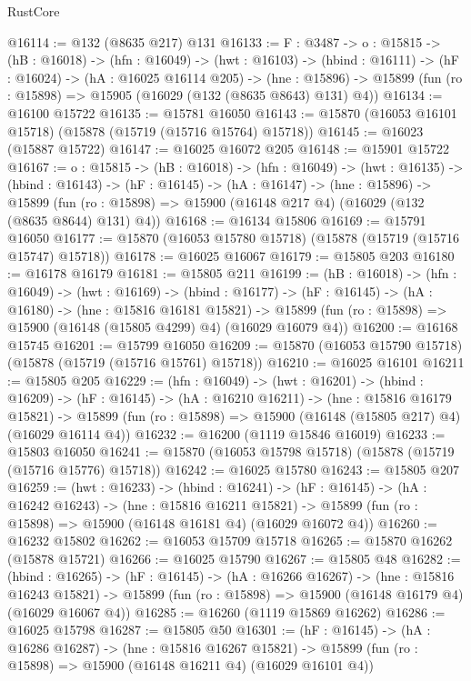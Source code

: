 \begin{lexlean}{RustCore}
\begin{coremodule}
@16114 := @132 (@8635 @217) @131
@16133 := {F : @3487} ->
  {o : @15815} ->
  (hB : @16018) ->
  (hfn : @16049) ->
  (hwt : @16103) ->
  (hbind : @16111) ->
  (hF : @16024) ->
  (hA : @16025 @16114 @205) ->
  (hne : @15896) -> @15899 (fun (ro : @15898) => @15905 (@16029 (@132 (@8635 @8643) @131) @4))
@16134 := @16100 @15722
@16135 := @15781 @16050
@16143 := @15870 (@16053 @16101 @15718) (@15878 (@15719 (@15716 @15764) @15718))
@16145 := @16023 (@15887 @15722)
@16147 := @16025 @16072 @205
@16148 := @15901 @15722
@16167 := {o : @15815} ->
  (hB : @16018) ->
  (hfn : @16049) ->
  (hwt : @16135) ->
  (hbind : @16143) ->
  (hF : @16145) ->
  (hA : @16147) ->
  (hne : @15896) ->
  @15899 (fun (ro : @15898) => @15900 (@16148 @217 @4) (@16029 (@132 (@8635 @8644) @131) @4))
@16168 := @16134 @15806
@16169 := @15791 @16050
@16177 := @15870 (@16053 @15780 @15718) (@15878 (@15719 (@15716 @15747) @15718))
@16178 := @16025 @16067
@16179 := @15805 @203
@16180 := @16178 @16179
@16181 := @15805 @211
@16199 := (hB : @16018) ->
  (hfn : @16049) ->
  (hwt : @16169) ->
  (hbind : @16177) ->
  (hF : @16145) ->
  (hA : @16180) ->
  (hne : @15816 @16181 @15821) ->
  @15899 (fun (ro : @15898) => @15900 (@16148 (@15805 @4299) @4) (@16029 @16079 @4))
@16200 := @16168 @15745
@16201 := @15799 @16050
@16209 := @15870 (@16053 @15790 @15718) (@15878 (@15719 (@15716 @15761) @15718))
@16210 := @16025 @16101
@16211 := @15805 @205
@16229 := (hfn : @16049) ->
  (hwt : @16201) ->
  (hbind : @16209) ->
  (hF : @16145) ->
  (hA : @16210 @16211) ->
  (hne : @15816 @16179 @15821) ->
  @15899 (fun (ro : @15898) => @15900 (@16148 (@15805 @217) @4) (@16029 @16114 @4))
@16232 := @16200 (@1119 @15846 @16019)
@16233 := @15803 @16050
@16241 := @15870 (@16053 @15798 @15718) (@15878 (@15719 (@15716 @15776) @15718))
@16242 := @16025 @15780
@16243 := @15805 @207
@16259 := (hwt : @16233) ->
  (hbind : @16241) ->
  (hF : @16145) ->
  (hA : @16242 @16243) ->
  (hne : @15816 @16211 @15821) ->
  @15899 (fun (ro : @15898) => @15900 (@16148 @16181 @4) (@16029 @16072 @4))
@16260 := @16232 @15802
@16262 := @16053 @15709 @15718
@16265 := @15870 @16262 (@15878 @15721)
@16266 := @16025 @15790
@16267 := @15805 @48
@16282 := (hbind : @16265) ->
  (hF : @16145) ->
  (hA : @16266 @16267) ->
  (hne : @15816 @16243 @15821) ->
  @15899 (fun (ro : @15898) => @15900 (@16148 @16179 @4) (@16029 @16067 @4))
@16285 := @16260 (@1119 @15869 @16262)
@16286 := @16025 @15798
@16287 := @15805 @50
@16301 := (hF : @16145) ->
  (hA : @16286 @16287) ->
  (hne : @15816 @16267 @15821) ->
  @15899 (fun (ro : @15898) => @15900 (@16148 @16211 @4) (@16029 @16101 @4))

\end{coremodule}
\end{lexlean}
